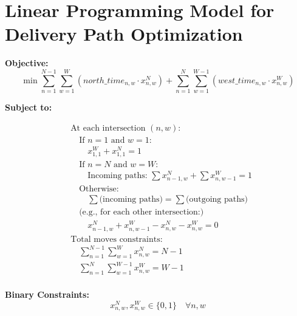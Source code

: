\documentclass{article}
\begin{document}
\section*{Linear Programming Model for Delivery Path Optimization}

\textbf{Objective:}
\[
\min \sum_{n=1}^{N-1} \sum_{w=1}^{W} \left( north\_time_{n,w} \cdot x_{n,w}^{N} \right) + \sum_{n=1}^{N} \sum_{w=1}^{W-1} \left( west\_time_{n,w} \cdot x_{n,w}^{W} \right)
\]

\textbf{Subject to:}

\begin{align*}
& \text{At each intersection } (n, w): \\
& \quad \text{If } n = 1 \text{ and } w = 1: \\
& \quad \quad x_{1,1}^{W} + x_{1,1}^{N} = 1 \\
& \quad \text{If } n = N \text{ and } w = W: \\
& \quad \quad \text{Incoming paths: } \sum x_{n-1,w}^{N} + \sum x_{n,w-1}^{W} = 1 \\
& \quad \text{Otherwise:} \\
& \quad \quad \sum \text{(incoming paths)} = \sum \text{(outgoing paths)} \\
& \quad\text{(e.g., for each other intersection:)} \\
& \quad \quad x_{n-1,w}^{N} + x_{n,w-1}^{W} - x_{n,w}^{N} - x_{n,w}^{W} = 0 \\
& \text{Total moves constraints:} \\
& \quad \sum_{n=1}^{N-1} \sum_{w=1}^{W} x_{n,w}^{N} = N - 1 \\
& \quad \sum_{n=1}^{N} \sum_{w=1}^{W-1} x_{n,w}^{W} = W - 1 \\
\end{align*}

\textbf{Binary Constraints:}
\[
x_{n,w}^{N}, x_{n,w}^{W} \in \{0, 1\} \quad \forall n, w
\]
\end{document}
